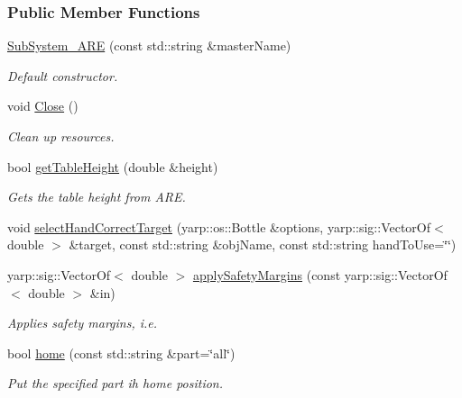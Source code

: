 \subsubsection*{Public Member Functions}
\begin{DoxyCompactItemize}
\item 
\hyperlink{group__icubclient__subsystems_a844f5ba28f7944ba14ccecc2801a4824}{Sub\+System\+\_\+\+A\+RE} (const std\+::string \&master\+Name)
\begin{DoxyCompactList}\small\item\em Default constructor. \end{DoxyCompactList}\item 
void \hyperlink{group__icubclient__subsystems_a570bb3cc879e0547a04e82b231a9f57f}{Close} ()
\begin{DoxyCompactList}\small\item\em Clean up resources. \end{DoxyCompactList}\item 
bool \hyperlink{group__icubclient__subsystems_a192608cd2b7f3956f2a2a2c89ecc9c9f}{get\+Table\+Height} (double \&height)
\begin{DoxyCompactList}\small\item\em Gets the table height from A\+RE. \end{DoxyCompactList}\item 
void \hyperlink{group__icubclient__subsystems_acd77a648ae64caad1620ad082e81d481}{select\+Hand\+Correct\+Target} (yarp\+::os\+::\+Bottle \&options, yarp\+::sig\+::\+Vector\+Of$<$ double $>$ \&target, const std\+::string \&obj\+Name, const std\+::string hand\+To\+Use=\char`\"{}\char`\"{})
\item 
yarp\+::sig\+::\+Vector\+Of$<$ double $>$ \hyperlink{group__icubclient__subsystems_a773b2a1d25472fe211be01c3b65189a4}{apply\+Safety\+Margins} (const yarp\+::sig\+::\+Vector\+Of$<$ double $>$ \&in)
\begin{DoxyCompactList}\small\item\em Applies safety margins, i.\+e. \end{DoxyCompactList}\item 
bool \hyperlink{group__icubclient__subsystems_ae328769c62775194ac87a2cb6143d3e2}{home} (const std\+::string \&part=\char`\"{}all\char`\"{})
\begin{DoxyCompactList}\small\item\em Put the specified part ih home position. \end{DoxyCompactList}\item 

\end{DoxyCompactItemize}
